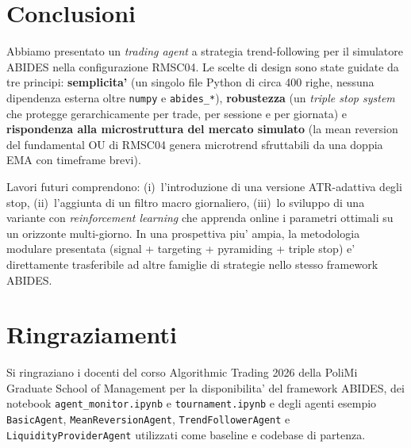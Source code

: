 \documentclass[11pt,a4paper]{article}
\begin{document}
\section{Conclusioni}
\label{sec:conclusions}

Abbiamo presentato un \emph{trading agent} a strategia
trend-following per il simulatore ABIDES nella configurazione
RMSC04.  Le scelte di design sono state guidate da tre principi:
\textbf{semplicita'} (un singolo file Python di circa 400 righe,
nessuna dipendenza esterna oltre \texttt{numpy} e \texttt{abides\_*}),
\textbf{robustezza} (un \emph{triple stop system} che protegge
gerarchicamente per trade, per sessione e per giornata) e
\textbf{rispondenza alla microstruttura del mercato simulato} (la
mean reversion del fundamental OU di RMSC04 genera microtrend
sfruttabili da una doppia EMA con timeframe brevi).

Lavori futuri comprendono: (i)~l'introduzione di una versione
ATR-adattiva degli stop, (ii)~l'aggiunta di un filtro macro
giornaliero, (iii)~lo sviluppo di una variante con \emph{reinforcement
learning} che apprenda online i parametri ottimali su un orizzonte
multi-giorno.  In una prospettiva piu' ampia, la metodologia
modulare presentata (signal + targeting + pyramiding + triple stop)
e' direttamente trasferibile ad altre famiglie di strategie nello
stesso framework ABIDES.

\section*{Ringraziamenti}

Si ringraziano i docenti del corso Algorithmic Trading 2026 della
PoliMi Graduate School of Management per la disponibilita' del
framework ABIDES, dei notebook \texttt{agent\_monitor.ipynb} e
\texttt{tournament.ipynb} e degli agenti esempio
\texttt{BasicAgent}, \texttt{MeanReversionAgent},
\texttt{TrendFollowerAgent} e \texttt{LiquidityProviderAgent}
utilizzati come baseline e codebase di partenza.
\end{document}
